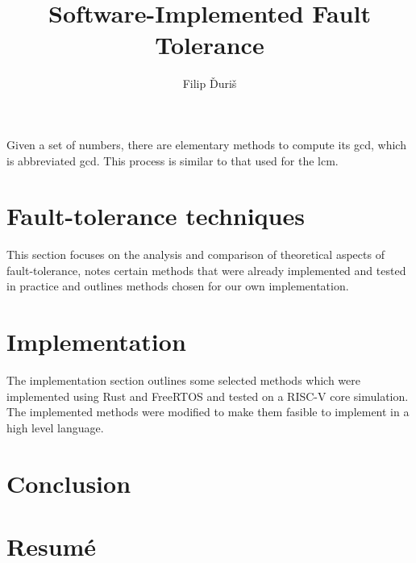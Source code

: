 \documentclass[12pt, letterpaper]{article}
\title{
    \Huge \textbf{Software-Implemented Fault Tolerance}
}
\author{Filip Ďuriš}
\begin{document}
% 


\newpage


\newpage





\tableofcontents
\newpage

Given a set of numbers, there are elementary methods to compute 
its \acrlong{gcd}, which is abbreviated \acrshort{gcd}. This process 
is similar to that used for the \acrfull{lcm}.

\glsaddall
\printglossary[type=\acronymtype]


\newpage




\newpage



\section{Fault-tolerance techniques}

This section focuses on the analysis and comparison of theoretical aspects of fault-tolerance, notes certain methods that were already implemented and tested in practice and outlines methods chosen for our own implementation.







\clearpage


\newpage


\clearpage

\clearpage
\section{Implementation}

The implementation section outlines some selected methods which were implemented using Rust and FreeRTOS and tested on a RISC-V core simulation. The implemented methods were modified to make them fasible to implement in a high level language.


\clearpage


\clearpage


\clearpage



\clearpage


\clearpage
\section{Conclusion}


\clearpage
\section{Resumé}

\newpage
\printbibliography
\end{document}
